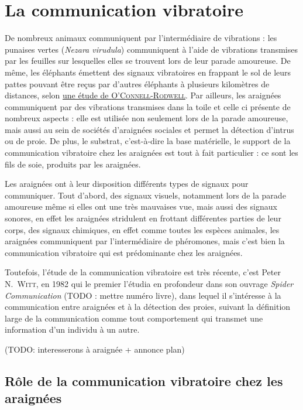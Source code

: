 \chapter{La communication vibratoire}

De nombreux animaux communiquent par l'intermédiaire de vibrations : les
punaises vertes (\emph{Nezara virudula}) communiquent à l'aide de
vibrations transmises par les feuilles sur lesquelles elles se trouvent
lors de leur parade amoureuse. De même, les éléphants émettent des
signaux vibratoires en frappant le sol de leurs pattes pouvant être
reçus par d'autres éléphants à plusieurs kilomètres de distances, selon
\href{http://www.ncbi.nlm.nih.gov/pubmed/11144599}{une étude de
\textsc{O'Connell-Rodwell}}. Par ailleurs, les araignées communiquent
par des vibrations transmises dans la toile et celle ci présente de
nombreux aspects : elle est utilisée non seulement lors de la parade
amoureuse, mais aussi au sein de sociétés d'araignées sociales et permet
la détection d'intrus ou de proie. De plus, le substrat, c'est-à-dire la
base matérielle, le support de la communication vibratoire chez les
araignées est tout à fait particulier : ce sont les fils de soie,
produits par les araignées.

Les araignées ont à leur disposition différents types de signaux pour
communiquer. Tout d'abord, des signaux visuels, notamment lors de la
parade amoureuse même si elles ont une très mauvaises vue, mais aussi
des signaux sonores, en effet les araignées stridulent en frottant
différentes parties de leur corps, des signaux chimiques, en effet comme
toutes les espèces animales, les araignées communiquent par
l'intermédiaire de phéromones, mais c'est bien la communication
vibratoire qui est prédominante chez les araignées.

Toutefois, l'étude de la communication vibratoire est très récente,
c'est Peter N.~\textsc{Witt}, en 1982 qui le premier l'étudia en
profondeur dans son ouvrage \emph{Spider Communication} (TODO : mettre
numéro livre), dans lequel il s'intéresse à la communication entre
araignées et à la détection des proies, suivant la définition large de
la communication comme tout comportement qui transmet une information
d'un individu à un autre.

(TODO: interesserons à araignée + annonce plan)

\section{Rôle de la communication vibratoire chez les araignées}

